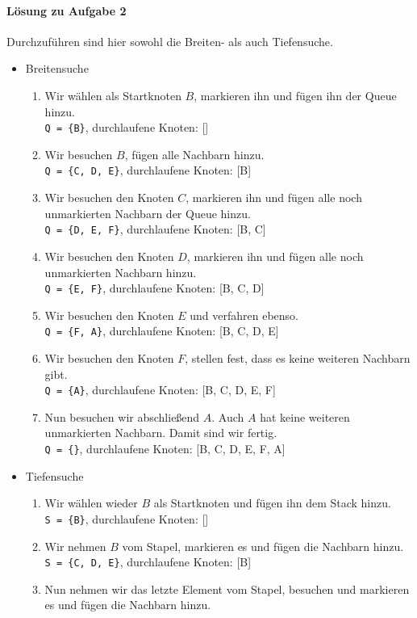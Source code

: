 \documentclass[11pt,a4paper]{scrartcl}
\begin{document}
\paragraph{Lösung zu Aufgabe 2} \label{a6.2:lsg} Durchzuführen sind hier sowohl die Breiten- als auch Tiefensuche.
\begin{itemize}
\item Breitensuche 
\begin{enumerate}
\item Wir wählen als Startknoten $B$, markieren ihn und fügen ihn der Queue hinzu. \\
\texttt{Q = \{B\}}, durchlaufene Knoten: []
\item Wir besuchen $B$, fügen alle Nachbarn hinzu. \\
\texttt{Q = \{C, D, E\}}, durchlaufene Knoten: [B]
\item Wir besuchen den Knoten $C$, markieren ihn und fügen alle noch unmarkierten Nachbarn der Queue hinzu. \\
\texttt{Q = \{D, E, F\}}, durchlaufene Knoten: [B, C]
\item Wir besuchen den Knoten $D$, markieren ihn und fügen alle noch unmarkierten Nachbarn hinzu. \\
\texttt{Q = \{E, F\}}, durchlaufene Knoten: [B, C, D]
\item Wir besuchen den Knoten $E$ und verfahren ebenso. \\
\texttt{Q = \{F, A\}}, durchlaufene Knoten: [B, C, D, E]
\item Wir besuchen den Knoten $F$, stellen fest, dass es keine weiteren Nachbarn gibt. \\
\texttt{Q = \{A\}}, durchlaufene Knoten: [B, C, D, E, F]
\item Nun besuchen wir abschließend $A$. Auch $A$ hat keine weiteren unmarkierten Nachbarn. Damit sind wir fertig. \\
\texttt{Q = \{\}}, durchlaufene Knoten: [B, C, D, E, F, A]
\end{enumerate}
\item Tiefensuche
\begin{enumerate}
\item Wir wählen wieder $B$ als Startknoten und fügen ihn dem Stack hinzu. \\
\texttt{S = \{B\}}, durchlaufene Knoten: []
\item Wir nehmen $B$ vom Stapel, markieren es und fügen die Nachbarn hinzu. \\
\texttt{S = \{C, D, E\}}, durchlaufene Knoten: [B]
\item Nun nehmen wir das letzte Element vom Stapel, besuchen und markieren es und fügen die Nachbarn hinzu. \\

\end{enumerate}
\end{itemize}
\end{document}
